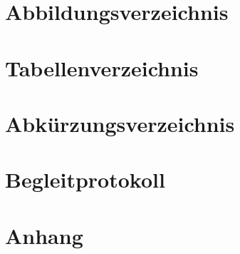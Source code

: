 \documentclass[a4paper]{article}
\begin{document}
\section{Abbildungsverzeichnis}

\section{Tabellenverzeichnis}

\section{Abkürzungsverzeichnis}

\section{Begleitprotokoll}

\section{Anhang}
\end{document}
